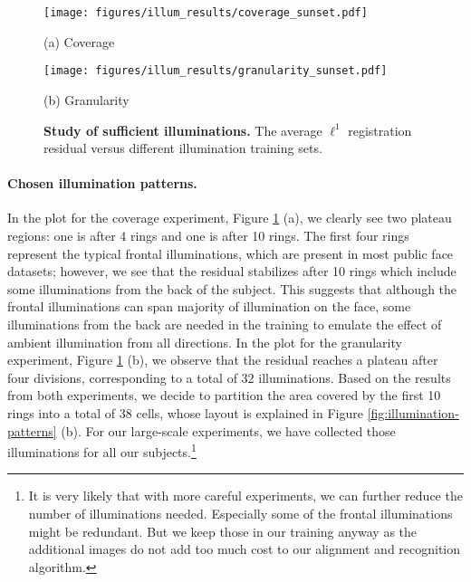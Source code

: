 \documentclass[10pt,twocolumn,letterpaper]{article}
\begin{document}
\begin{figure}[h]
\begin{minipage}{1.5in}
\texttt{[image: figures/illum\_results/coverage\_sunset.pdf]}
\centerline{\small (a) Coverage }
\end{minipage}\hspace{3mm}
\begin{minipage}{1.5in}
\texttt{[image: figures/illum\_results/granularity\_sunset.pdf]}
\centerline{\small (b) Granularity}
\end{minipage}
\vspace{.1in}
\caption{{\bf Study of sufficient illuminations.} The average $\ell^1$ registration residual versus different illumination training sets. \vspace{-0.5cm}}
\label{fig:illumination-sufficiency}
\end{figure}


\vspace{-3mm}\paragraph{Chosen illumination patterns.} In the plot for the coverage experiment, Figure \ref{fig:illumination-sufficiency} (a), we clearly see two plateau regions: one is after 4 rings and one is after 10 rings. The first four rings represent the typical frontal illuminations, which are present in most public face datasets; however, we see that the residual stabilizes after 10 rings which include some illuminations from the back of the subject. This suggests that although the frontal illuminations can span majority of illumination on the face, some illuminations from the back are needed in the training to emulate the effect of ambient illumination from all directions. In the plot for the granularity experiment, Figure \ref{fig:illumination-sufficiency} (b), we observe that the residual reaches a plateau after four divisions, corresponding to a total of 32 illuminations. Based on the results from both experiments, we decide to partition the area covered by the first 10 rings into a total of 38 cells, whose layout is explained in Figure \ref{fig:illumination-patterns} (b). For our large-scale experiments, we have collected those illuminations for all our subjects.\footnote{It is very likely that with more careful experiments, we can further reduce the number of illuminations needed. Especially some of the frontal illuminations might be redundant. But we keep those in our training anyway as the additional images do not add too much cost to our alignment and recognition algorithm.} 
\end{document}

